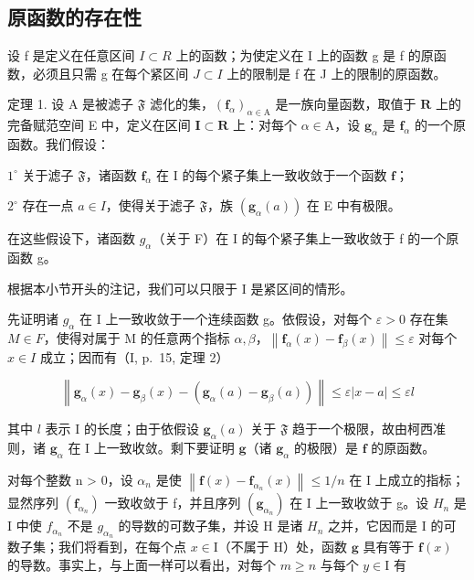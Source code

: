 \subsection{原函数的存在性}

设 f 是定义在任意区间 \(I \subset R\) 上的函数；为使定义在 I 上的函数 g 是 f 的原函数，必须且只需 g 在每个紧区间 \(J \subset I\) 上的限制是 f 在 J 上的限制的原函数。

定理 1. 设 A 是被滤子 \(\mathfrak{F}\) 滤化的集，\((\mathbf{f}_{\alpha})_{\alpha \in \mathrm{A}}\) 是一族向量函数，取值于 \(\mathbf{R}\) 上的完备赋范空间 E 中，定义在区间 \(\mathbf{I} \subset \mathbf{R}\) 上：对每个 \(\alpha \in \mathrm{A}\)，设 \(\mathbf{g}_{\alpha}\) 是 \(\mathbf{f}_{\alpha}\) 的一个原函数。我们假设：

\(1^{\circ}\) 关于滤子 \(\mathfrak{F}\)，诸函数 \(\mathbf{f}_{\alpha}\) 在 I 的每个紧子集上一致收敛于一个函数 \(\mathbf{f}\)；

\(2^{\circ}\) 存在一点 \(a \in I\)，使得关于滤子 \(\mathfrak{F}\)，族 \((\mathbf{g}_{\alpha}(a))\) 在 E 中有极限。

在这些假设下，诸函数 \(g_{\alpha}\)（关于 F）在 I 的每个紧子集上一致收敛于 f 的一个原函数 g。

根据本小节开头的注记，我们可以只限于 I 是紧区间的情形。

先证明诸 \(g_{\alpha}\) 在 I 上一致收敛于一个连续函数 g。依假设，对每个 \(\varepsilon > 0\) 存在集 \(M \in F\)，使得对属于 M 的任意两个指标 \(\alpha, \beta\)，\(\left\|\mathbf{f}_{\alpha}(x) - \mathbf{f}_{\beta}(x)\right\| \leqslant \varepsilon\) 对每个 \(x \in I\) 成立；因而有（I, p.~15, 定理 2）

\[
\left\| \mathbf {g} _ {\alpha} (x) - \mathbf {g} _ {\beta} (x) - (\mathbf {g} _ {\alpha} (a) - \mathbf {g} _ {\beta} (a)) \right\| \leqslant \varepsilon | x - a | \leqslant \varepsilon l
\]

其中 \(l\) 表示 I 的长度；由于依假设 \(\mathbf{g}_{\alpha}(a)\) 关于 \(\mathfrak{F}\) 趋于一个极限，故由柯西准则，诸 \(\mathbf{g}_{\alpha}\) 在 I 上一致收敛。剩下要证明 \(\mathbf{g}\)（诸 \(\mathbf{g}_{\alpha}\) 的极限）是 \(\mathbf{f}\) 的原函数。

对每个整数 n \textgreater{} 0，设 \(\alpha_{n}\) 是使 \(\left\|\mathbf{f}(x) - \mathbf{f}_{\alpha_{n}}(x)\right\| \leqslant 1/n\) 在 I 上成立的指标；显然序列 \(\left(\mathbf{f}_{\alpha_{n}}\right)\) 一致收敛于 f，并且序列 \(\left(\mathbf{g}_{\alpha_{n}}\right)\) 在 I 上一致收敛于 g。设 \(H_{n}\) 是 I 中使 \(f_{\alpha_{n}}\) 不是 \(g_{\alpha_{n}}\) 的导数的可数子集，并设 H 是诸 \(H_{n}\) 之并，它因而是 I 的可数子集；我们将看到，在每个点 \(x \in \mathrm{I}\)（不属于 \(\mathrm{H}\)）处，函数 \(\mathbf{g}\) 具有等于 \(\mathbf{f}(x)\) 的导数。事实上，与上面一样可以看出，对每个 \(m \geqslant n\) 与每个 \(y \in \mathrm{I}\) 有

